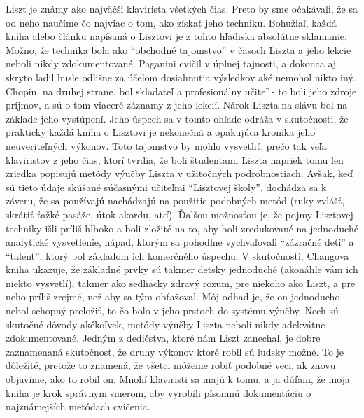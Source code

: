 \documentclass[11pt,a4paper]{book}
\begin{document}
Liszt je známy ako najväčší klavirista všetkých čias. Preto by sme očakávali, že sa od neho naučíme čo najviac o tom, ako získať jeho techniku. Bohužiaľ, každá kniha alebo článku napísaná o Lisztovi je z tohto hľadiska absolútne sklamanie. Možno, že technika bola ako “obchodné tajomstvo” v časoch Liszta a jeho lekcie neboli nikdy zdokumentované. Paganini cvičil v úplnej tajnosti, a dokonca aj skryto ladil husle odlišne za účelom dosiahnutia výsledkov aké nemohol nikto iný. Chopin, na druhej strane, bol skladateľ a profesionálny učiteľ - to boli jeho zdroje príjmov, a sú o tom viaceré záznamy z jeho lekcií. Nárok Liszta na slávu bol na základe jeho vystúpení. Jeho úspech sa v tomto ohľade odráža v skutočnosti, že prakticky každá kniha o Lisztovi je nekonečná a opakujúca kronika jeho neuveriteľných výkonov. Toto tajomstvo by mohlo vysvetliť, prečo tak veľa klaviristov z jeho čias, ktorí tvrdia, že boli študentami Liszta napriek tomu len zriedka popisujú metódy výučby Liszta v užitočných podrobnostiach. Avšak, keď sú tieto údaje skúšané súčasnými učiteľmi “Lisztovej školy”, dochádza sa k  záveru, že sa používajú nachádzajú na použitie podobných metód (ruky zvlášť, skrátiť ťažké pasáže, útok akordu, atď). Ďalšou možnosťou je, že pojmy Lisztovej techniky išli príliš hlboko a boli zložité na to, aby boli zredukované na jednoduché analytické vysvetlenie, nápad, ktorým sa pohodlne vychvaľovali “zázračné deti” a “talent”, ktorý bol základom ich komerčného úspechu. V skutočnosti, Changova kniha ukazuje, že základné prvky sú takmer detsky jednoduché (akonáhle vám ich niekto vysvetlí), takmer ako sedliacky zdravý rozum, pre niekoho ako Liszt, a pre neho príliš zrejmé, než aby sa tým obťažoval. Môj odhad je, že on jednoducho nebol schopný preložiť, to čo bolo v jeho prstoch do systému výučby. Nech sú skutočné dôvody akékoľvek, metódy výučby Liszta neboli nikdy adekvátne zdokumentované. Jedným z dedičstva, ktoré nám Liszt zanechal, je dobre zaznamenaná skutočnosť, že druhy výkonov ktoré robil sú ľudsky možné. To je dôležité, pretože to znamená, že všetci môžeme robiť podobné veci, ak znovu objavíme, ako to robil on. Mnohí klaviristi sa majú k tomu, a ja dúfam, že moja kniha je krok správnym smerom, aby vyrobili písomnú dokumentáciu o najznámejších metódach cvičenia. 
\end{document}
